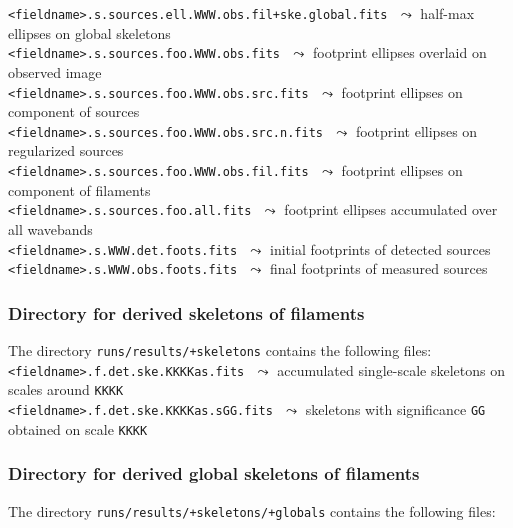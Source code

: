 \documentclass[a4paper,10pt]{article}
\begin{document}
{\small\verb!<fieldname>.s.sources.ell.WWW.obs.fil+ske.global.fits!} $\,\,\leadsto$ half-max ellipses on global skeletons\\
{\small\verb!<fieldname>.s.sources.foo.WWW.obs.fits!} $\,\,\leadsto$ footprint ellipses overlaid on observed image\\
{\small\verb!<fieldname>.s.sources.foo.WWW.obs.src.fits!} $\,\,\leadsto$ footprint ellipses on component of sources\\
{\small\verb!<fieldname>.s.sources.foo.WWW.obs.src.n.fits!} $\,\,\leadsto$ footprint ellipses on regularized sources\\
{\small\verb!<fieldname>.s.sources.foo.WWW.obs.fil.fits!} $\,\,\leadsto$ footprint ellipses on component of filaments\\
{\small\verb!<fieldname>.s.sources.foo.all.fits!} $\,\,\leadsto$ footprint ellipses accumulated over all wavebands\\
{\small\verb!<fieldname>.s.WWW.det.foots.fits!} $\,\,\leadsto$ initial footprints of detected sources\\
{\small\verb!<fieldname>.s.WWW.obs.foots.fits!} $\,\,\leadsto$ final footprints of measured sources

\subsubsection{Directory for derived skeletons of filaments}
\label{skeletons}

The directory \verb!runs/results/+skeletons! contains the following files:\\

\vspace{-2mm}\noindent
{\small\verb!<fieldname>.f.det.ske.KKKKas.fits!} $\,\,\leadsto$ accumulated single-scale skeletons on scales around \verb!KKKK!\\
{\small\verb!<fieldname>.f.det.ske.KKKKas.sGG.fits!} $\,\,\leadsto$ skeletons with significance \verb!GG! obtained on scale \verb!KKKK!

\subsubsection{Directory for derived global skeletons of filaments}
\label{globals}

The directory \verb!runs/results/+skeletons/+globals! contains the following files:\\
\end{document}
